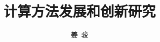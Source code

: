 
\title{计算方法发展和创新研究}
\author[ ]{姜~骏}   %
\renewcommand*{\Authfont}{\small\rm} %
\renewcommand*{\Affilfont}{\small\it} %
\renewcommand\Authands{ and } %
\renewcommand\Authands{ , } %
\date{} %


\maketitle
